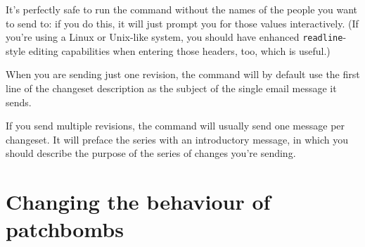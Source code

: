 It's perfectly safe to run the  command
without the names of the people you want to send to: if you do this,
it will just prompt you for those values interactively.  (If you're
using a Linux or Unix-like system, you should have enhanced
\texttt{readline}-style editing capabilities when entering those
headers, too, which is useful.)

When you are sending just one revision, the 
command will by default use the first line of the changeset
description as the subject of the single email message it sends.

If you send multiple revisions, the  command
will usually send one message per changeset.  It will preface the
series with an introductory message, in which you should describe the
purpose of the series of changes you're sending.

\section{Changing the behaviour of patchbombs}

